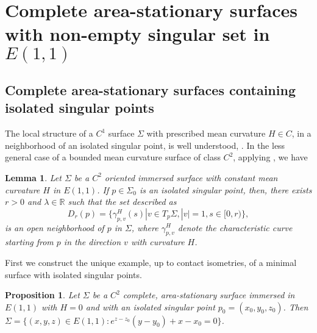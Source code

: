 \documentclass[10pt]{amsart}
\newtheorem{proposition}[theorem]{Proposition}
\newtheorem{lemma}[theorem]{Lemma}
\theoremstyle{definition}
\theoremstyle{remark}
\numberwithin{equation}{section}
\begin{document}
\section{Complete area-stationary surfaces with non-empty singular set in ${E(1,1)}$}\label{sec:stationary}

\subsection{Complete area-stationary surfaces containing isolated singular points}  

The local structure of a $C^1$ surface ${\Sigma}$ with prescribed mean curvature $H\in C$, in a neighborhood of an isolated singular point, is well understood, \cite[Theorem~D and Corollary~E]{CJHMY2}. In the less general case of a bounded mean curvature surface of class $C^2$, applying  \cite[Theorem~B and Section~7]{CJHMY}, we have

\begin{lemma}\label{singularsetthpoint} Let ${\Sigma}$ be a ${C}^2$ oriented immersed surface with constant mean curvature $H$ in ${E(1,1)}$. If $p\in{\Sigma}_{0}$ is an isolated singular point,  then, there exists $r > 0$ and $\lambda\in 
\mathbb{R}$ such that the set described as 
\begin{equation*}
D_{r} (p) = \{\gamma^{H}_{p,v}  (s)| v \in T_{p}{\Sigma}, |v| = 1, s \in [0, r)\}, 
\end{equation*}
is an open neighborhood of $p$ in ${\Sigma}$, where $\gamma^{H}_{p,v}$ denote the characteristic curve starting from $p$ in the direction $v$ with curvature $H$.
\end{lemma}
 
First we construct the unique example, up to contact isometries, of a minimal surface with isolated singular points.  

\begin{proposition}\label{prop:minimalstationarysingularpoint} Let ${\Sigma}$ be a $C^2$ complete, area-stationary surface immersed in ${E(1,1)}$ with $H=0$ and with an isolated singular point $p_0=(x_0,y_0,z_0)$. Then ${\Sigma}=\{(x,y,z)\in{E(1,1)} : e^{z-z_0}(y-y_0)+x-x_0=0\}$.
\end{proposition}
\end{document}
